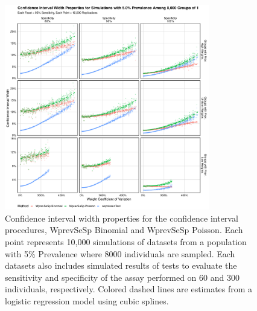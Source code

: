 \documentclass[AMA,STIX1COL]{WileyNJD-v2}
\begin{document}
\begin{figure}
\centering
\includegraphics[width=0.8\textwidth]{figures/imperfect_confidence_interval_width_8000_groups_0_05_prev}
\caption{Confidence interval width properties for the confidence interval procedures, WprevSeSp Binomial and WprevSeSp Poisson.
Each point represents 10,000 simulations of datasets from a population with 5\% Prevalence where 8000 individuals are sampled.
Each datasets also includes simulated results of tests to evaluate the sensitivity and specificity of the assay performed on 60 and 300 individuals, respectively.
Colored dashed lines are estimates from a logistic regression model using cubic splines.}
\label{fig:imperfect_confidence_interval_width_8000_groups_0_05_prev}
\end{figure}
\end{document}
